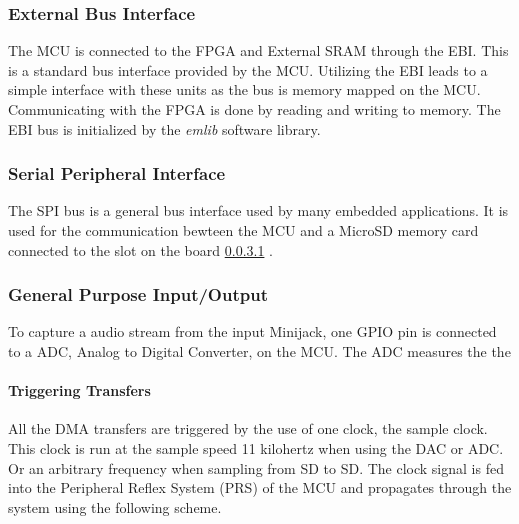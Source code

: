 \subsubsection{External Bus Interface}
The MCU is connected to the FPGA and External SRAM through the EBI. This is a standard
bus interface provided by the MCU. Utilizing the EBI leads to a
simple interface with these units as the bus is memory mapped on the MCU.
Communicating with the FPGA is done by reading and writing to memory.
The EBI bus is initialized by the {\it emlib} software library.

\subsubsection{Serial Peripheral Interface}
The SPI bus is a general bus interface used by many embedded applications. It is used
for the communication bewteen the MCU and a MicroSD memory card connected to the slot
on the board \ref{} . 

\subsubsection{General Purpose Input/Output}
To capture a audio stream from the input Minijack, one GPIO pin is connected to a 
ADC, Analog to Digital Converter, on the MCU. The ADC measures the the 


\paragraph{Triggering Transfers}

All the DMA transfers are triggered by the use of one clock, the sample clock.
This clock is run at the sample speed 11 kilohertz when using the DAC or ADC. Or
an arbitrary frequency when sampling from SD to SD. The clock signal is fed into
the Peripheral Reflex System  (PRS) of the MCU and propagates through the system
using the following scheme.

